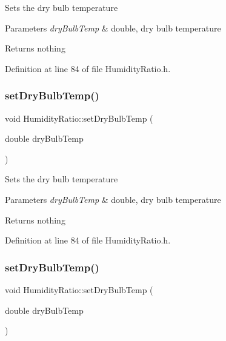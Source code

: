 Sets the dry bulb temperature


\begin{DoxyParams}{Parameters}
{\em dry\+Bulb\+Temp} & double, dry bulb temperature\\
\hline
\end{DoxyParams}
\begin{DoxyReturn}{Returns}
nothing 
\end{DoxyReturn}


Definition at line 84 of file Humidity\+Ratio.\+h.

\mbox{\label{class_humidity_ratio_a291bccce6b8665412987a31bd2633d9a}} 
\subsubsection{\texorpdfstring{set\+Dry\+Bulb\+Temp()}{setDryBulbTemp()}\hspace{0.1cm}{\footnotesize\ttfamily [2/3]}}
{\footnotesize\ttfamily void Humidity\+Ratio\+::set\+Dry\+Bulb\+Temp (\begin{DoxyParamCaption}\item[{double}]{dry\+Bulb\+Temp }\end{DoxyParamCaption})\hspace{0.3cm}{\ttfamily [inline]}}

Sets the dry bulb temperature


\begin{DoxyParams}{Parameters}
{\em dry\+Bulb\+Temp} & double, dry bulb temperature\\
\hline
\end{DoxyParams}
\begin{DoxyReturn}{Returns}
nothing 
\end{DoxyReturn}


Definition at line 84 of file Humidity\+Ratio.\+h.

\mbox{\label{class_humidity_ratio_a291bccce6b8665412987a31bd2633d9a}} 
\subsubsection{\texorpdfstring{set\+Dry\+Bulb\+Temp()}{setDryBulbTemp()}\hspace{0.1cm}{\footnotesize\ttfamily [3/3]}}
{\footnotesize\ttfamily void Humidity\+Ratio\+::set\+Dry\+Bulb\+Temp (\begin{DoxyParamCaption}\item[{double}]{dry\+Bulb\+Temp }\end{DoxyParamCaption})\hspace{0.3cm}{\ttfamily [inline]}}

